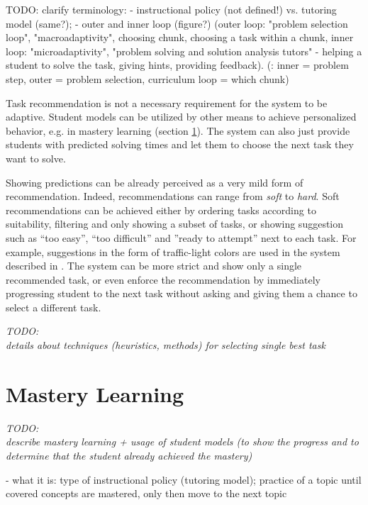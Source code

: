 TODO: clarify terminology:
- instructional policy (not defined!) vs. tutoring model (same?);
- outer and inner loop (figure?)
  (outer loop: "problem selection loop", "macroadaptivity",
  choosing chunk, choosing a task within a chunk,
  inner loop: "microadaptivity", "problem solving and solution analysis tutors"
  - helping a student to solve the task, giving hints, providing feedback).
  (\cite{its-learner-models}: inner = problem step, outer = problem selection,
  curriculum loop = which chunk)

Task recommendation is not a necessary requirement
  for the system to be adaptive.
Student models can be utilized by other means to achieve personalized behavior,
  e.g. in mastery learning (section \ref{sec:mastery-learning}).
The system can also just provide students with predicted solving times
  and let them to choose the next task they want to solve.

Showing predictions can be already perceived as a very mild form of recommendation.
Indeed, recommendations can range from \emph{soft} to \emph{hard}.
Soft recommendations can be achieved either by
  ordering tasks according to suitability,
  filtering and only showing a subset of tasks,
  or showing suggestion such as
  ``too easy'', ``too difficult'' and ''ready to attempt'' next to each task.
For example, suggestions in the form of traffic-light colors
  are used in the system described in \cite{its-programming}.
The system can be more strict and show only a single recommended task,
  or even enforce the recommendation by immediately progressing student to
  the next task without asking and giving them a chance to select a different task.

\bigskip
\emph{TODO:\\details about techniques (heuristics, methods) for selecting single best task}


\section{Mastery Learning}
\label{sec:mastery-learning}

\emph{TODO:\\describe mastery learning + usage of student models%
(to show the progress and to determine that the student already achieved the mastery)}

- what it is: type of instructional policy (tutoring model); practice of a topic until covered concepts are mastered, only then move to the next topic

